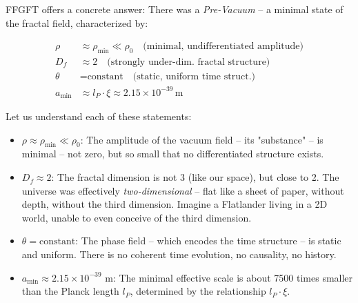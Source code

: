 	FFGFT offers a concrete answer: There was a \textit{Pre-Vacuum} -- a minimal state of the fractal field, characterized by:
	
	\[
	\begin{aligned}
		\rho &\approx \rho_{\min} \ll \rho_0 \quad \text{(minimal, undifferentiated amplitude)} \\
		D_f &\approx 2 \quad \text{(strongly under-dim. fractal structure)} \\
		\theta &= \text{constant} \quad \text{(static, uniform time struct.)} \\
		a_{\min} &\approx l_P \cdot \xi \approx 2.15 \times 10^{-39} \, \text{m}
	\end{aligned}
	\]

	
	Let us understand each of these statements:
	
	\begin{itemize}[leftmargin=*]
		\item $\rho \approx \rho_{\min} \ll \rho_0$: The amplitude of the vacuum field -- its "substance" -- is minimal -- not zero, but so small that no differentiated structure exists.
		
		\item $D_f \approx 2$: The fractal dimension is not 3 (like our space), but close to 2. The universe was effectively \textit{two-dimensional} -- flat like a sheet of paper, without depth, without the third dimension. Imagine a Flatlander living in a 2D world, unable to even conceive of the third dimension.
		
		\item $\theta = \text{constant}$: The phase field -- which encodes the time structure -- is static and uniform. There is no coherent time evolution, no causality, no history.
		
		\item $a_{\min} \approx 2.15 \times 10^{-39}$ m: The minimal effective scale is about 7500 times smaller than the Planck length $l_P$, determined by the relationship $l_P \cdot \xi$.
	\end{itemize}
	
